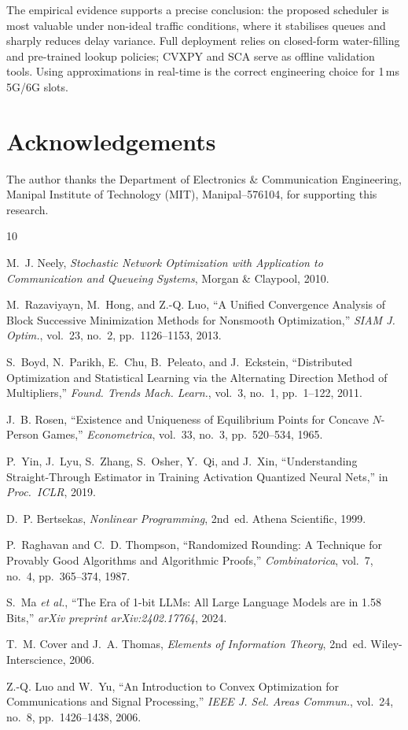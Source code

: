 \documentclass[conference]{IEEEtran}
\begin{document}
The empirical evidence supports a precise conclusion: the proposed scheduler is most valuable under non-ideal traffic conditions, where it stabilises queues and sharply reduces delay variance. Full deployment relies on closed-form water-filling and pre-trained lookup policies; CVXPY and SCA serve as offline validation tools. Using approximations in real-time is the correct engineering choice for 1\,ms 5G/6G slots.

\section*{Acknowledgements}

The author thanks the Department of Electronics \& Communication Engineering, Manipal Institute of Technology (MIT), Manipal--576104, for supporting this research.

\begin{thebibliography}{10}

M.~J. Neely,
\textit{Stochastic Network Optimization with Application to Communication and Queueing Systems},
Morgan \& Claypool, 2010.

M.~Razaviyayn, M.~Hong, and Z.-Q. Luo,
``A Unified Convergence Analysis of Block Successive Minimization Methods for Nonsmooth Optimization,''
\textit{SIAM J. Optim.}, vol.~23, no.~2, pp.~1126--1153, 2013.

S.~Boyd, N.~Parikh, E.~Chu, B.~Peleato, and J.~Eckstein,
``Distributed Optimization and Statistical Learning via the Alternating Direction Method of Multipliers,''
\textit{Found. Trends Mach. Learn.}, vol.~3, no.~1, pp.~1--122, 2011.

J.~B. Rosen,
``Existence and Uniqueness of Equilibrium Points for Concave $N$-Person Games,''
\textit{Econometrica}, vol.~33, no.~3, pp.~520--534, 1965.

P.~Yin, J.~Lyu, S.~Zhang, S.~Osher, Y.~Qi, and J.~Xin,
``Understanding Straight-Through Estimator in Training Activation Quantized Neural Nets,''
in \textit{Proc.\ ICLR}, 2019.

D.~P. Bertsekas,
\textit{Nonlinear Programming}, 2nd~ed.
Athena Scientific, 1999.

P.~Raghavan and C.~D. Thompson,
``Randomized Rounding: A Technique for Provably Good Algorithms and Algorithmic Proofs,''
\textit{Combinatorica}, vol.~7, no.~4, pp.~365--374, 1987.

S.~Ma \textit{et al.},
``The Era of 1-bit LLMs: All Large Language Models are in 1.58 Bits,''
\textit{arXiv preprint arXiv:2402.17764}, 2024.

T.~M. Cover and J.~A. Thomas,
\textit{Elements of Information Theory}, 2nd~ed.
Wiley-Interscience, 2006.

Z.-Q. Luo and W.~Yu,
``An Introduction to Convex Optimization for Communications and Signal Processing,''
\textit{IEEE J. Sel. Areas Commun.}, vol.~24, no.~8, pp.~1426--1438, 2006.

\end{thebibliography}
\end{document}
